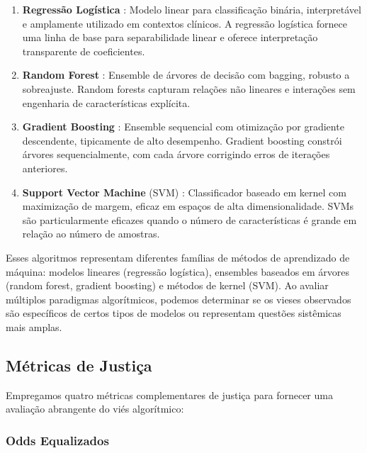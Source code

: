 \begin{enumerate}[leftmargin=*]
    \item \textbf{Regressão Logística} \cite{cox1958}: Modelo linear para 
          classificação binária, interpretável e amplamente utilizado em 
          contextos clínicos. A regressão logística fornece uma linha de 
          base para separabilidade linear e oferece interpretação transparente 
          de coeficientes.
    \item \textbf{Random Forest} \cite{breiman2001}: Ensemble de árvores 
          de decisão com bagging, robusto a sobreajuste. Random forests 
          capturam relações não lineares e interações sem engenharia de 
          características explícita.
    \item \textbf{Gradient Boosting} \cite{friedman2001}: Ensemble sequencial 
          com otimização por gradiente descendente, tipicamente de alto 
          desempenho. Gradient boosting constrói árvores sequencialmente, 
          com cada árvore corrigindo erros de iterações anteriores.
    \item \textbf{Support Vector Machine} (SVM) \cite{vapnik1995}: 
          Classificador baseado em kernel com maximização de margem, eficaz 
          em espaços de alta dimensionalidade. SVMs são particularmente 
          eficazes quando o número de características é grande em relação 
          ao número de amostras.
\end{enumerate}

Esses algoritmos representam diferentes famílias de métodos de aprendizado 
de máquina: modelos lineares (regressão logística), ensembles baseados em 
árvores (random forest, gradient boosting) e métodos de kernel (SVM). Ao 
avaliar múltiplos paradigmas algorítmicos, podemos determinar se os vieses 
observados são específicos de certos tipos de modelos ou representam 
questões sistêmicas mais amplas.

\subsection{Métricas de Justiça}

Empregamos quatro métricas complementares de justiça para fornecer uma 
avaliação abrangente do viés algorítmico:

\subsubsection{Odds Equalizados}

